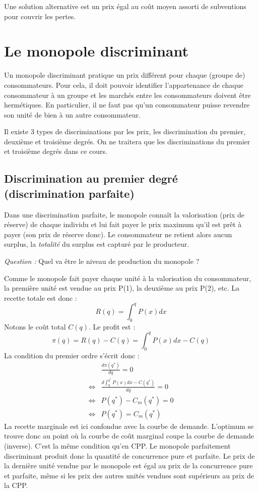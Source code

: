 \documentclass[
]{book}
\theoremstyle{definition}
\theoremstyle{definition}
\theoremstyle{definition}
\theoremstyle{definition}
\theoremstyle{remark}
\begin{document}
Une solution alternative est un prix égal au coût moyen assorti de subventions pour couvrir les pertes.

\hypertarget{le-monopole-discriminant}{%
\section{Le monopole discriminant}\label{le-monopole-discriminant}}

Un monopole discriminant pratique un prix différent pour chaque (groupe de) consommateurs.
Pour cela, il doit pouvoir identifier l'appartenance de chaque consommateur à un groupe et les marchés entre les consommateurs doivent être hermétiques.
En particulier, il ne faut pas qu'un consommateur puisse revendre son unité de bien à un autre consommateur.

Il existe 3 types de discriminations par les prix, les discrimination du premier, deuxième et troisième degrés.
On ne traitera que les discriminations du premier et troisième degrés dans ce cours.

\hypertarget{discrimination-au-premier-degruxe9-discrimination-parfaite}{%
\subsection{Discrimination au premier degré (discrimination parfaite)}\label{discrimination-au-premier-degruxe9-discrimination-parfaite}}

Dans une discrimination parfaite, le monopole connaît la valorisation (prix de réserve) de chaque individu et lui fait payer le prix maximum qu'il est prêt à payer (son prix de réserve donc).
Le consommateur ne retient alors aucun surplus, la \emph{totalité} du surplus est capturé par le producteur.

\emph{Question :} Quel va être le niveau de production du monopole ?

Comme le monopole fait payer chaque unité à la valorisation du consommateur, la première unité est vendue au prix P(1), la deuxième au prix P(2), etc.
La recette totale est donc :
\[
R(q) = \int_0^q P(x) dx
\]
Notons le coût total \(C(q)\).
Le profit est :
\[
\pi(q) = R(q) - C(q) = \int_0^q P(x) dx -C(q)
\]
La condition du premier ordre s'écrit donc :
\[
\begin{array}{rl}
&\frac{d\pi(q^*)}{dq} = 0\\
\Leftrightarrow & \frac{d\int_0^{q^*} P(x) dx -C(q^*)}{dq} = 0\\
\Leftrightarrow & P(q^*) - C_m(q^*) = 0\\
\Leftrightarrow & P(q^*) = C_m(q^*)
\end{array}
\]
La recette marginale est ici confondue avec la courbe de demande.
L'optimum se trouve donc au point où la courbe de coût marginal coupe la courbe de demande (inverse).
C'est la même condition qu'en CPP.
Le monopole parfaitement discriminant produit donc la quantité de concurrence pure et parfaite.
Le prix de la dernière unité vendue par le monopole est égal au prix de la concurrence pure et parfaite, même si les prix des autres unités vendues sont supérieurs au prix de la CPP.
\end{document}
